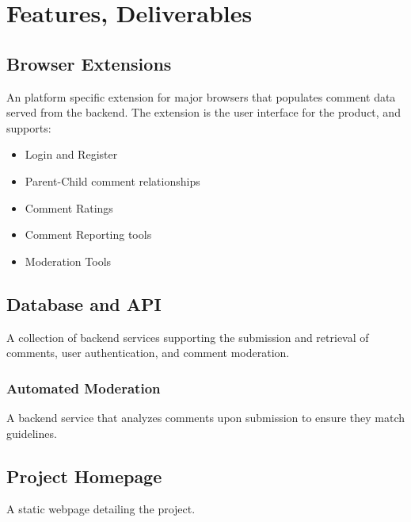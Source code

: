 \documentclass[proposal.tex]{subfiles}
\begin{document}
    
\section{Features, Deliverables}

\subsection{Browser Extensions}

An platform specific extension for major browsers that populates comment data served from the backend.
The extension is the user interface for the product, and supports:

\begin{itemize}
    \item Login and Register
    \item Parent-Child comment relationships
    \item Comment Ratings
    \item Comment Reporting tools
    \item Moderation Tools
\end{itemize}

\subsection{Database and API}

A collection of backend services supporting the submission and retrieval of comments, user authentication, and comment moderation.

\subsubsection{Automated Moderation}

A backend service that analyzes comments upon submission to ensure they match guidelines.

\subsection{Project Homepage}

A static webpage detailing the project.
\end{document}
